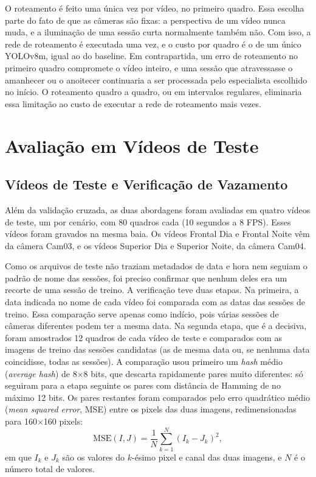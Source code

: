 O roteamento é feito uma única vez por vídeo, no primeiro quadro. Essa escolha parte do fato de que as câmeras são fixas: a perspectiva de um vídeo nunca muda, e a iluminação de uma sessão curta normalmente também não. Com isso, a rede de roteamento é executada uma vez, e o custo por quadro é o de um único YOLOv8m, igual ao do baseline. Em contrapartida, um erro de roteamento no primeiro quadro compromete o vídeo inteiro, e uma sessão que atravessasse o amanhecer ou o anoitecer continuaria a ser processada pelo especialista escolhido no início. O roteamento quadro a quadro, ou em intervalos regulares, eliminaria essa limitação ao custo de executar a rede de roteamento mais vezes.

\section{Avaliação em Vídeos de Teste}
\label{sec:avaliacao-videos}

\subsection{Vídeos de Teste e Verificação de Vazamento}
\label{subsec:videos-teste}

Além da validação cruzada, as duas abordagens foram avaliadas em quatro vídeos de teste, um por cenário, com 80 quadros cada (10 segundos a 8 FPS). Esses vídeos foram gravados na mesma baia. Os vídeos Frontal Dia e Frontal Noite vêm da câmera Cam03, e os vídeos Superior Dia e Superior Noite, da câmera Cam04.

Como os arquivos de teste não traziam metadados de data e hora nem seguiam o padrão de nome das sessões, foi preciso confirmar que nenhum deles era um recorte de uma sessão de treino. A verificação teve duas etapas. Na primeira, a data indicada no nome de cada vídeo foi comparada com as datas das sessões de treino. Essa comparação serve apenas como indício, pois várias sessões de câmeras diferentes podem ter a mesma data. Na segunda etapa, que é a decisiva, foram amostrados 12 quadros de cada vídeo de teste e comparados com as imagens de treino das sessões candidatas (as de mesma data ou, se nenhuma data coincidisse, todas as sessões). A comparação usou primeiro um \textit{hash} médio (\textit{average hash}) de 8$\times$8 bits, que descarta rapidamente pares muito diferentes: só seguiram para a etapa seguinte os pares com distância de Hamming de no máximo 12 bits. Os pares restantes foram comparados pelo erro quadrático médio (\textit{mean squared error}, MSE) entre os pixels das duas imagens, redimensionadas para 160$\times$160 pixels:
\begin{equation}
    \mathrm{MSE}(I, J) = \frac{1}{N} \sum_{k=1}^{N} \left( I_k - J_k \right)^2,
    \label{eq:mse}
\end{equation}
em que $I_k$ e $J_k$ são os valores do $k$-ésimo pixel e canal das duas imagens, e $N$ é o número total de valores.

